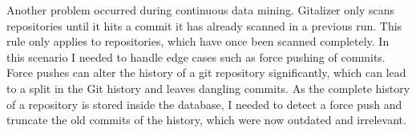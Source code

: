 Another problem occurred during continuous data mining.
Gitalizer only scans repositories until it hits a commit it has already scanned in a previous run.
This rule only applies to repositories, which have once been scanned completely.
In this scenario I needed to handle edge cases such as force pushing of commits.
Force pushes can alter the history of a git repository significantly, which can lead to a split in the Git history and leaves dangling commits.
As the complete history of a repository is stored inside the database, I needed to detect a force push and truncate the old commits of the history, which were now outdated and irrelevant.
